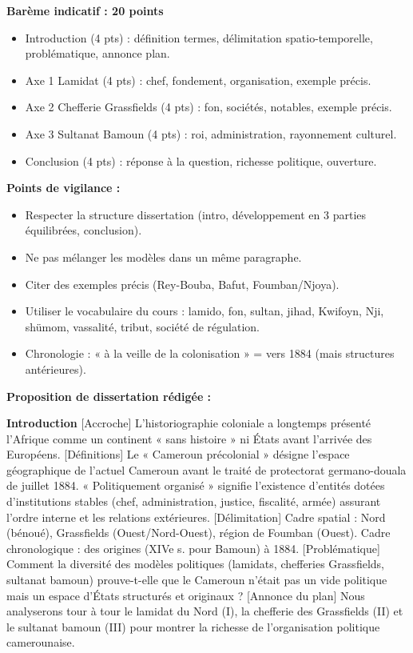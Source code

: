 \documentclass[11pt]{article}
\begin{document}
\begin{corrige}
\textbf{Barème indicatif : 20 points}
\begin{itemize}
\item Introduction (4 pts) : définition termes, délimitation spatio-temporelle, problématique, annonce plan.
\item Axe 1 Lamidat (4 pts) : chef, fondement, organisation, exemple précis.
\item Axe 2 Chefferie Grassfields (4 pts) : fon, sociétés, notables, exemple précis.
\item Axe 3 Sultanat Bamoun (4 pts) : roi, administration, rayonnement culturel.
\item Conclusion (4 pts) : réponse à la question, richesse politique, ouverture.
\end{itemize}

\textbf{Points de vigilance :}
\begin{itemize}
\item Respecter la structure dissertation (intro, développement en 3 parties équilibrées, conclusion).
\item Ne pas mélanger les modèles dans un même paragraphe.
\item Citer des exemples précis (Rey-Bouba, Bafut, Foumban/Njoya).
\item Utiliser le vocabulaire du cours : lamido, fon, sultan, jihad, Kwifoyn, Nji, shümom, vassalité, tribut, société de régulation.
\item Chronologie : « à la veille de la colonisation » = vers 1884 (mais structures antérieures).
\end{itemize}

\medskip
\textbf{Proposition de dissertation rédigée :}

\textbf{Introduction}
[Accroche] L'historiographie coloniale a longtemps présenté l'Afrique comme un continent « sans histoire » ni États avant l'arrivée des Européens. [Définitions] Le « Cameroun précolonial » désigne l'espace géographique de l'actuel Cameroun avant le traité de protectorat germano-douala de juillet 1884. « Politiquement organisé » signifie l'existence d'entités dotées d'institutions stables (chef, administration, justice, fiscalité, armée) assurant l'ordre interne et les relations extérieures. [Délimitation] Cadre spatial : Nord (bénoué), Grassfields (Ouest/Nord-Ouest), région de Foumban (Ouest). Cadre chronologique : des origines (XIVe s. pour Bamoun) à 1884. [Problématique] Comment la diversité des modèles politiques (lamidats, chefferies Grassfields, sultanat bamoun) prouve-t-elle que le Cameroun n'était pas un vide politique mais un espace d'États structurés et originaux ? [Annonce du plan] Nous analyserons tour à tour le lamidat du Nord (I), la chefferie des Grassfields (II) et le sultanat bamoun (III) pour montrer la richesse de l'organisation politique camerounaise.


\end{corrige}
\end{document}
